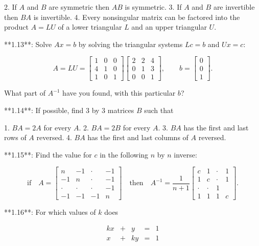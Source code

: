 2. If \(A\) and \(B\) are symmetric then \(AB\) is symmetric.
3. If \(A\) and \(B\) are invertible then \(BA\) is invertible.
4. Every nonsingular matrix can be factored into the product \(A=LU\) of a lower triangular \(L\) and an upper triangular \(U\).

**1.13**: Solve \(Ax=b\) by solving the triangular systems \(Lc=b\) and \(Ux=c\):

\[A=LU=\begin{bmatrix}1&0&0\\ 4&1&0\\ 1&0&1\end{bmatrix}\begin{bmatrix}2&2&4\\ 0&1&3\\ 0&0&1\end{bmatrix},\qquad b=\begin{bmatrix}0\\ 0\\ 1\end{bmatrix}.\]

What part of \(A^{-1}\) have you found, with this particular \(b\)?

**1.14**: If possible, find 3 by 3 matrices \(B\) such that

1. \(BA=2A\) for every \(A\).
2. \(BA=2B\) for every \(A\).
3. \(BA\) has the first and last rows of \(A\) reversed.
4. \(BA\) has the first and last columns of \(A\) reversed.

**1.15**: Find the value for \(c\) in the following \(n\) by \(n\) inverse:

\[\text{if}\quad A=\begin{bmatrix}n&-1&\cdot&-1\\ -1&n&\cdot&-1\\ \cdot&\cdot&\cdot&-1\\ -1&-1&-1&n\end{bmatrix}\quad\text{then}\quad A^{-1}=\frac{1}{n+1}\begin{bmatrix} c&1&\cdot&1\\ 1&c&\cdot&1\\ \cdot&\cdot&1\\ 1&1&1&c\end{bmatrix}.\]

**1.16**: For which values of \(k\) does

\[\begin{array}{rcl}kx&+&y&=&1\\ x&+&ky&=&1\end{array}\]

